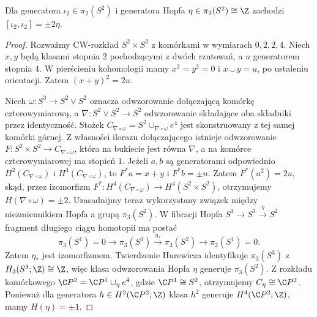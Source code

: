 \begin{twierdzenie}
\label{thm:whitehead-square-v7}
Dla generatora $\iota_2\in\pi_2(S^2)$ i generatora
Hopfa $\eta\in\pi_3(S^2)\cong\Z$ zachodzi
$[\iota_2,\iota_2]=\pm2\eta$.
\end{twierdzenie}
\begin{proof}
Rozważmy CW-rozkład $S^2\times S^2$ z komórkami
w wymiarach $0,2,2,4$. Niech $x,y$ będą klasami
stopnia $2$ pochodzącymi z dwóch rzutowań, a $u$
generatorem stopnia $4$. W pierścieniu kohomologii
mamy $x^2=y^2=0$ i $x\smile y=u$,
po ustaleniu orientacji. Zatem
$(x+y)^2=2u$.

Niech $\omega:S^3\to S^2\vee S^2$ oznacza odwzorowanie
dołączającą komórkę czterowymiarową, a
$\nabla:S^2\vee S^2\to S^2$ odwzorowanie składające oba
składniki przez identyczność. Stożek
$C_{\nabla\circ\omega}=S^2\cup_{\nabla\circ\omega}e^4$
jest skonstruowany z tej samej komórki górnej.
Z własności ilorazu dołączającego istnieje odwzorowanie
$F:S^2\times S^2\to C_{\nabla\circ\omega}$,
która na bukiecie jest równa $\nabla$, a na komórce
czterowymiarowej ma stopień $1$. Jeżeli $a,b$
są generatorami odpowiednio $H^2(C_{\nabla\circ\omega})$
i $H^4(C_{\nabla\circ\omega})$, to
$F^*a=x+y$ i $F^*b=\pm u$.
Zatem $F^*(a^2)=2u$, skąd, przez izomorfizm
$F^*:H^4(C_{\nabla\circ\omega})\to H^4(S^2\times S^2)$,
otrzymujemy $H(\nabla\circ\omega)=\pm2$.
Uzasadnijmy teraz wykorzystany związek między
niezmiennikiem Hopfa a grupą $\pi_3(S^2)$.
W fibracji Hopfa $S^1\to S^3\xrightarrow{\eta}S^2$
fragment długiego ciągu homotopii ma postać
\[
\pi_3(S^1)=0\longrightarrow\pi_3(S^3)
\xrightarrow{\eta_*}\pi_3(S^2)
\longrightarrow\pi_2(S^1)=0.
\]
Zatem $\eta_*$ jest izomorfizmem. Twierdzenie Hurewicza
identyfikuje $\pi_3(S^3)$ z $H_3(S^3;\Z)\cong\Z$,
więc klasa odwzorowania Hopfa $\eta$ generuje $\pi_3(S^2)$.
Z rozkładu komórkowego
$\C P^2=\C P^1\cup_{\eta}e^4$, gdzie
$\C P^1\cong S^2$, otrzymujemy $C_\eta\cong\C P^2$.
Ponieważ dla generatora $h\in H^2(\C P^2;\Z)$
klasa $h^2$ generuje $H^4(\C P^2;\Z)$, mamy
$H(\eta)=\pm1$.


\end{proof}
